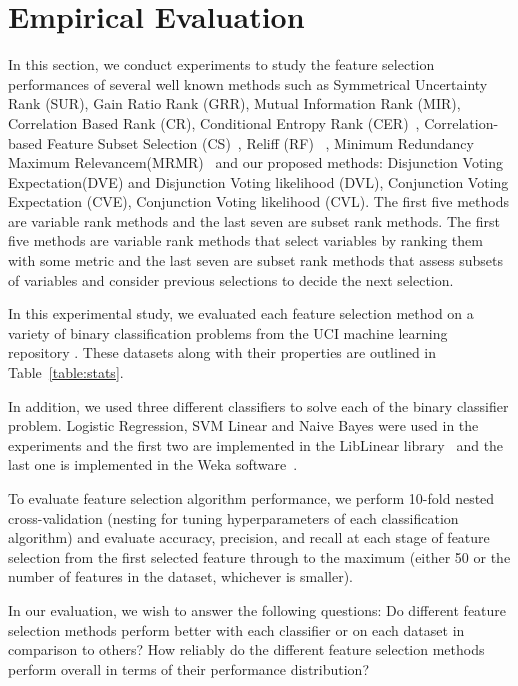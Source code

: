 \section{Empirical Evaluation}

In this section, we conduct experiments to study the feature selection
performances of several well known methods such as Symmetrical
Uncertainty Rank (SUR), Gain Ratio Rank (GRR), Mutual Information Rank
(MIR), Correlation Based Rank (CR), Conditional Entropy Rank (CER)~\cite{guyon_jmlr03}, Correlation-based Feature Subset Selection (CS)~\cite{Hall1998}, Reliff (RF)~\cite{Robnik-Sikonja2003} , Minimum Redundancy Maximum Relevancem(MRMR)~\cite{peng2005} and our proposed methods:  Disjunction Voting Expectation(DVE) and  Disjunction Voting likelihood (DVL), Conjunction Voting Expectation (CVE), Conjunction Voting likelihood (CVL). The first five methods are variable rank methods and the last seven are subset rank methods. The first five methods are variable rank methods that select variables by ranking them with some metric and the last seven are subset rank methods that assess subsets of variables and consider previous selections to decide the next selection.

In this experimental study, we evaluated each feature selection
method on a variety of binary classification problems 
from the UCI machine learning repository \cite{Bache+Lichman:2013}.
These datasets along with their properties are outlined in 
Table~\ref{table:stats}.

In addition, we used three different classifiers to solve each of the
binary classifier problem. Logistic Regression, SVM Linear and Naive
Bayes were used in the experiments and the first two are implemented
in the LibLinear library~\cite{REF08a} and the last one is implemented in
the Weka software~\cite{weka}.
 
To evaluate feature selection algorithm performance, we perform 
10-fold nested cross-validation (nesting for tuning hyperparameters of each classification
algorithm) and evaluate accuracy, precision, and recall at each stage of
feature selection from the first selected feature through to the maximum
(either 50 or the number of features in the dataset, whichever is smaller).

In our evaluation, we wish to answer the following questions:
Do different feature selection methods perform better with
each classifier or on each dataset in comparison to others?
How reliably do the different feature selection methods perform overall
in terms of their performance distribution?

